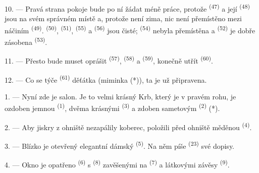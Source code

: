 10. --- Pravá strana pokoje bude po ní žádat méně práce, protože 
\textsuperscript{(47)} a její  \textsuperscript{(48)} jsou na svém správném
místě a, protože není zima, nic není přemístěno mezi náčiním 
\textsuperscript{(49)}.  \textsuperscript{(50)}, 
\textsuperscript{(51)},  \textsuperscript{(55)} a 
\textsuperscript{(56)} jsou čisté;  \textsuperscript{(54)} nebyla
přemístěna a  \textsuperscript{(52)} je dobře zásobena 
\textsuperscript{(53)}.



11. --- Přesto bude muset oprášit  \textsuperscript{(57)},
 \textsuperscript{(58)} a 
\textsuperscript{(59)}, konečně utřít  \textsuperscript{(60)}.

12. --- Co se týče  \textsuperscript{(61)} děťátka (miminka (*)), ta je už
připravena.

\VUsaut{5.0mm}
\VUsaut{3.0mm}

1. --- Nyní zde je salon. Je to velmi krásný  Krb, který je v pravém rohu, je
ozdoben jemnou  \textsuperscript{(1)}, dvěma krásnými
 \textsuperscript{(3)} a zdoben sametovým 
\textsuperscript{(2)} (*).

2. --- Aby jiskry z ohniště nezapálily koberec, položili před ohniště měděnou
 \textsuperscript{(4)}.

3. --- Blízko je otevřený elegantní dámský  \textsuperscript{(5)}. Na něm
píše  \textsuperscript{(23)} své dopisy.

4. --- Okno je opatřeno  \textsuperscript{(6)} s 
\textsuperscript{(8)} zavěšenými na  \textsuperscript{(7)} a látkovými závěsy
 \textsuperscript{(9)}.

